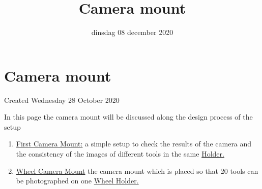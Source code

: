 \documentclass{scrartcl}
\title{Camera mount}
\date{dinsdag 08 december 2020}
\author{}
\begin{document}
\maketitle

		\section{Camera mount}

Created Wednesday 28 October 2020



In this page the camera mount will be discussed along the design process of the setup



\begin{enumerate}[1]
\item \href{./Camera_mount/First_Camera_Mount.tex}{First Camera Mount:} a simple setup to check the results of the camera and the consistency of the images of different tools in the same \href{./Tool_Holder/Simple_holder.tex}{Holder.}
\item \href{./Camera_mount/Wheel_Camera_Mount.tex}{Wheel Camera Mount} the camera mount which is placed so that 20 tools can be photographed on one \href{./Tool_Holder/Wheel_Holder.tex}{Wheel Holder.} 
\end{enumerate}
\end{document}
